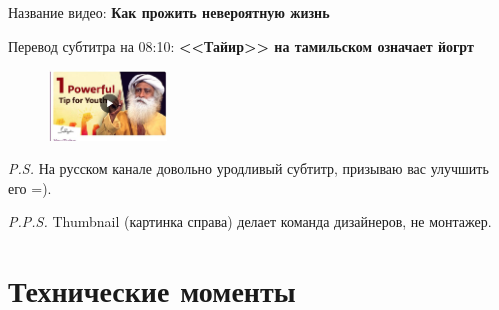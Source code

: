\documentclass[
a4paper, %
12pt, %
article,
onecolumn, %
openany, %
]{memoir}
\begin{document}
Название видео: \textbf{Как прожить невероятную жизнь}

Перевод субтитра на 08:10: \textbf{<<Тайир>> на тамильском означает йогрт}


\begin{figure}
  \begin{center}
    \includegraphics[width=0.28\textwidth]{thumbnail}
  \end{center}
\end{figure}

\emph{P.S.} На русском канале довольно уродливый субтитр, призываю вас улучшить его =).

\emph{P.P.S.} Thumbnail (картинка справа) делает команда дизайнеров, не монтажер.


\newpage
\section{Технические моменты}
\end{document}
